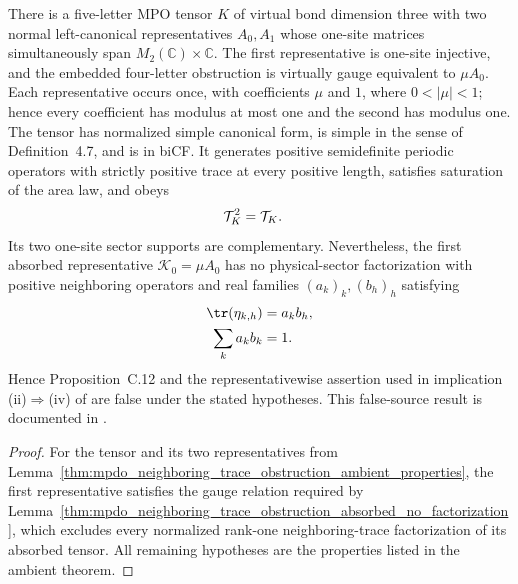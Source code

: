 \begin{lemma}
    \label{thm:mpdo_sal_zcl_bnt_sector_structure}
    \leanok
    There is a five-letter MPO tensor $K$ of virtual bond dimension three
    with two normal left-canonical representatives $A_0,A_1$ whose one-site
    matrices simultaneously span $M_2(\mathbb C)\times\mathbb C$. The first
    representative is one-site injective, and the embedded four-letter
    obstruction is virtually gauge equivalent to $\mu A_0$. Each
    representative occurs once, with coefficients $\mu$ and $1$, where
    $0<|\mu|<1$; hence every coefficient has modulus at most one and the second
    has modulus one. The tensor has normalized simple canonical form, is
    simple in the sense of Definition~4.7, and is in biCF. It generates
    positive semidefinite periodic operators with
    strictly positive trace at every positive length, satisfies
    saturation of the area law, and obeys
    \begin{align}
        \mathcal T_K^2 & =\mathcal T_K.
        \notag
    \end{align}
    Its two one-site sector supports are complementary. Nevertheless, the
    first absorbed representative $\mathcal K_0=\mu A_0$ has no
    physical-sector factorization with positive neighboring operators and
    real families $(a_k)_k,(b_h)_h$ satisfying
    \begin{align}
        \tr(\eta_{k,h}) & =a_kb_h, \notag \\
        \sum_k a_kb_k   & =1. \notag
    \end{align}
    Hence Proposition~C.12 and the representativewise assertion used in
    implication (ii)$\Rightarrow$(iv) of
    \cite[Theorem~4.9 and Appendix~C.2, lines~1628--1782]
    {Cirac2016MPDO_arXiv} are false under the stated hypotheses. This
    false-source result is documented in \cite{gap:cpgsv17_pf_rank_one}.
\end{lemma}

\begin{proof}\leanok
    For the tensor and its two representatives from
    Lemma~\ref{thm:mpdo_neighboring_trace_obstruction_ambient_properties},
    the first representative satisfies the gauge relation required by
    Lemma~\ref{thm:mpdo_neighboring_trace_obstruction_absorbed_no_factorization},
    which excludes every normalized rank-one neighboring-trace factorization
    of its absorbed tensor. All remaining hypotheses are the properties listed
    in the ambient theorem.
\end{proof}
